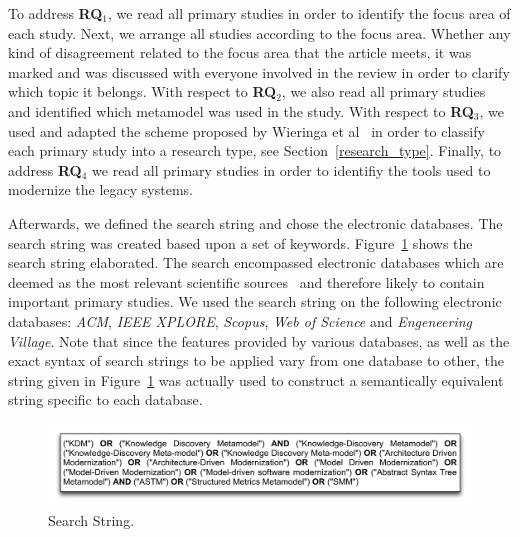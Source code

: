 

To address \textbf{RQ$_1$}, we read all primary studies in order to identify the focus area of each study. Next, we arrange all studies according to the focus area. Whether any kind of disagreement related to the focus area that the article meets, it was marked and was discussed with everyone involved in the review in order to clarify which topic it belongs. With respect to \textbf{RQ$_2$}, we also read all primary studies and identified which metamodel was used in the study. With respect to \textbf{RQ$_3$}, we used and adapted the scheme proposed by Wieringa et al~\cite{Wieringa:2005:REP:1107677.1107683} in order to classify each primary study into a research type, see Section~\ref{research_type}. Finally, to address \textbf{RQ$_4$} we read all primary studies in order to identifiy the tools used to modernize the legacy systems. %


Afterwards, we defined the search string and chose the electronic databases. The search string was created based upon a set of keywords. Figure~\ref{search_string} shows the search string elaborated. The search encompassed electronic databases which are deemed as the most relevant scientific sources~\cite{Kitchenham} and therefore likely to contain important primary studies. We used the search string on the following electronic databases: \textit{ACM}, \textit{IEEE XPLORE}, \textit{Scopus}, \textit{Web of Science} and \textit{Engeneering Village}. Note that since the features provided by various databases, as well as the exact syntax of search strings to be applied vary from one database to other, the string given in Figure~\ref{search_string} was actually used to construct a semantically equivalent string specific to each database.


\begin{figure}[!h]
\centering
  \includegraphics[scale=0.35]{figuras/SearchStringADM}
\caption{Search String.}
\label{search_string}
\end{figure} 

